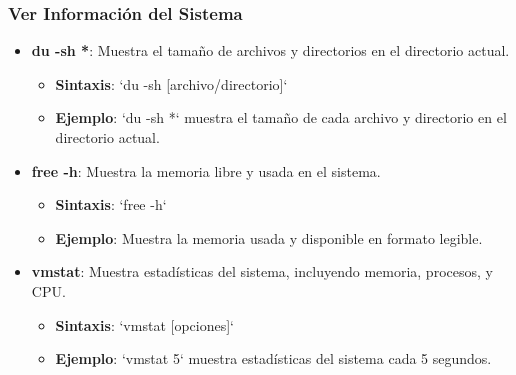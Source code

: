 \documentclass{beamer}
\begin{document}
\begin{frame}
\frametitle{Ver Información del Sistema}
\begin{itemize}
    \item \textbf{du -sh *}: Muestra el tamaño de archivos y directorios en el directorio actual.
    \begin{itemize}
        \item \textbf{Sintaxis}: `du -sh [archivo/directorio]`
        \item \textbf{Ejemplo}: `du -sh *` muestra el tamaño de cada archivo y directorio en el directorio actual.
    \end{itemize}
    
    \item \textbf{free -h}: Muestra la memoria libre y usada en el sistema.
    \begin{itemize}
        \item \textbf{Sintaxis}: `free -h`
        \item \textbf{Ejemplo}: Muestra la memoria usada y disponible en formato legible.
    \end{itemize}
    \item \textbf{vmstat}: Muestra estadísticas del sistema, incluyendo memoria, procesos, y CPU.
    \begin{itemize}
        \item \textbf{Sintaxis}: `vmstat [opciones]`
        \item \textbf{Ejemplo}: `vmstat 5` muestra estadísticas del sistema cada 5 segundos.
    \end{itemize}
\end{itemize}
\end{frame}
\end{document}
